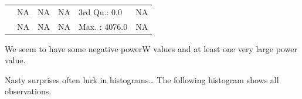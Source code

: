 \documentclass[]{article}
\begin{document}
\begin{longtable}[]{@{}llllll@{}}
\begin{minipage}[t]{0.04\columnwidth}\raggedright\strut
\strut
\end{minipage} & \begin{minipage}[t]{0.16\columnwidth}\raggedright\strut
NA\strut
\end{minipage} & \begin{minipage}[t]{0.16\columnwidth}\raggedright\strut
NA\strut
\end{minipage} & \begin{minipage}[t]{0.16\columnwidth}\raggedright\strut
NA\strut
\end{minipage} & \begin{minipage}[t]{0.15\columnwidth}\raggedright\strut
3rd Qu.: 0.0\strut
\end{minipage} & \begin{minipage}[t]{0.16\columnwidth}\raggedright\strut
NA\strut
\end{minipage}\tabularnewline
\begin{minipage}[t]{0.04\columnwidth}\raggedright\strut
\strut
\end{minipage} & \begin{minipage}[t]{0.16\columnwidth}\raggedright\strut
NA\strut
\end{minipage} & \begin{minipage}[t]{0.16\columnwidth}\raggedright\strut
NA\strut
\end{minipage} & \begin{minipage}[t]{0.16\columnwidth}\raggedright\strut
NA\strut
\end{minipage} & \begin{minipage}[t]{0.15\columnwidth}\raggedright\strut
Max. : 4076.0\strut
\end{minipage} & \begin{minipage}[t]{0.16\columnwidth}\raggedright\strut
NA\strut
\end{minipage}\tabularnewline
\bottomrule
\end{longtable}

We seem to have some negative powerW values and at least one very large
power value.

Nasty surprises often lurk in histograms\ldots{} The following histogram
shows all observations.
\end{document}
